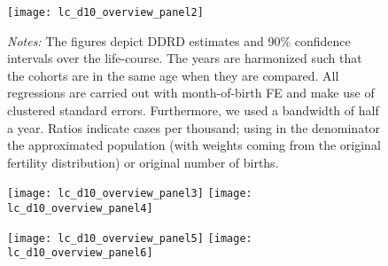 \begin{landscape}
\begin{figure}[H]
\centering
\begin{minipage}{.9\linewidth}
\texttt{[image: lc\_d10\_overview\_panel2]}
{\scriptsize \emph{Notes:} The figures depict DDRD estimates and 90\% confidence intervals over the life-course. The years are harmonized such that the cohorts are in the same age when they are compared. All regressions are carried out with month-of-birth FE and make use of clustered standard errors. Furthermore, we used a bandwidth of half a year. Ratios indicate cases per thousand; using in the denominator the approximated population (with weights coming from the original fertility distribution) or original number of births. \par}
\end{minipage}
\end{figure}
\end{landscape}
\begin{figure}[H]%
	\centering
	\texttt{[image: lc\_d10\_overview\_panel3]}
	\texttt{[image: lc\_d10\_overview\_panel4]}
\end{figure}
\begin{figure}[H]
	\centering	
	\texttt{[image: lc\_d10\_overview\_panel5]}
	\texttt{[image: lc\_d10\_overview\_panel6]}
\end{figure}
